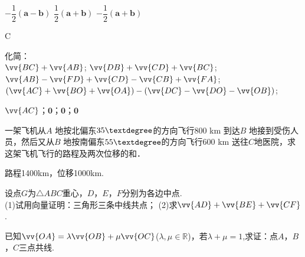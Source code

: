 \begin{exercise}
        {$-\dfrac12(\bm a-\bm b)$}
        {$\dfrac12(\bm a+\bm b)$}
        {$-\dfrac12(\bm a+\bm b)$}
      \begin{answer}
        C
      \end{answer}
    \item
      化简：\\
       $\vv{BC}+\vv{AB}$; \hspace{2em}  $\vv{DB}+\vv{CD}+\vv{BC}$;\\
       $\vv{AB}-\vv{FD}+\vv{CD}-\vv{CB}+\vv{FA}$;\hspace{2em}  $(\vv{AC}+\vv{BO}+\vv{OA})-(\vv{DC}-\vv{DO}-\vv{OB})$;\\
      \vspace{4cm}
      \begin{answer}
        $\vv{AC}$；$\bm 0$；$\bm 0$；$\bm 0$
      \end{answer}
    \item
      一架飞机从$A$ 地按北偏东$35\textdegree$的方向飞行800 km 到达$B$ 地接到受伤人员，然后又从$B$ 地按南偏东$55\textdegree$的方向飞行600 km 送往$C $地医院，求这架飞机飞行的路程及两次位移的和．
    \begin{answer}
      路程1400km，位移1000km.
    \end{answer}
    \vspace{4cm}
    \item
      设点$G$为$\triangle ABC$重心，$D$，$E$，$F$分别为各边中点.\\
      (1)试用向量证明：三角形三条中线共点；
      (2)求$\vv{AD}+\vv{BE}+\vv{CF}$.
      \begin{flushright}
      \end{flushright}
      \vspace{2cm}
    \item
      已知$\vv{OA}=\lambda\vv{OB}+\mu\vv{OC}$($\lambda,\mu\in\mathbb{R}$)，若$\lambda+\mu=1$,求证：点$A$，$B$，$C$三点共线.\\

\end{exercise}
